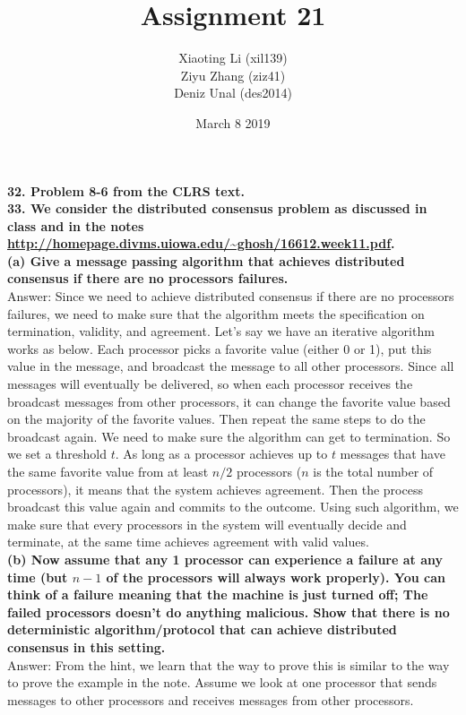 \documentclass{article}
\title{Assignment 21}
\author{Xiaoting Li (xil139) \\
Ziyu Zhang (ziz41) \\
Deniz Unal (des2014)}
\date{March 8 2019}
\begin{document}
\maketitle

\noindent
\textbf{32. Problem 8-6 from the CLRS text.}\\ \newline
\textbf{33. We consider the distributed consensus problem as discussed in class and in the notes \url{http://homepage.divms.uiowa.edu/~ghosh/16612.week11.pdf}.}\\ \newline
\textbf{(a) Give a message passing algorithm that achieves distributed consensus if there are no processors failures.} \\ \newline
Answer: Since we need to achieve distributed consensus if there are no processors failures, we need to make sure that the algorithm meets the specification on termination, validity, and agreement. Let's say we have an iterative algorithm works as below. Each processor picks a favorite value (either 0 or 1), put this value in the message, and broadcast the message to all other processors. Since all messages will eventually be delivered, so when each processor receives the broadcast messages from other processors, it can change the favorite value based on the majority of the favorite values. Then repeat the same steps to do the broadcast again. We need to make sure the algorithm can get to termination. So we set a threshold $t$. As long as a processor achieves up to $t$ messages that have the same favorite value from at least $n/2$ processors ($n$ is the total number of processors), it means that the system achieves agreement. Then the process broadcast this value again and commits to the outcome. Using such algorithm, we make sure that every processors in the system will eventually decide and terminate, at the same time achieves agreement with valid values.  \\ \newline
\textbf{(b) Now assume that any 1 processor can experience a failure at any time (but $n-1$ of the processors will always work properly). You can think of a failure meaning that the machine is just turned off; The failed processors doesn’t do anything malicious. Show that there is no deterministic algorithm/protocol that can achieve distributed consensus in this setting.} \\ \newline 
Answer: From the hint, we learn that the way to prove this is similar to the way to prove the example in the note. Assume we look at one processor that sends messages to other processors and receives messages from other processors. \\ \newline
\end{document}
